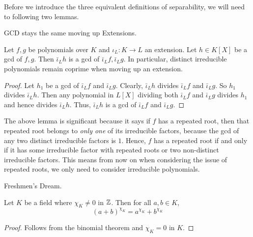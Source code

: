 \documentclass[../book.tex]{subfiles}
\begin{document}
Before we introduce the three equivalent definitions of separability, 
we will need to following two lemmas. 
\begin{lem} GCD stays the same moving up Extensions. 
    
    Let $f, g$ be polynomials over $K$ and $\iota_L : K \to L$ an extension.
    Let $h \in K[X]$ be a gcd of $f, g$. 
    Then $\bar\iota_L h$ is a gcd of $\bar\iota_L f, \bar\iota_L g$. 
    In particular, distinct irreducible polynomials remain coprime 
    when moving up an extension. 
\end{lem}
\begin{proof}
    Let $h_1$ be a gcd of $\bar\iota_L f$ and $\bar\iota_L g$. 
    Clearly, $\bar\iota_L h$ divides $\bar\iota_L f$ and $\bar\iota_L g$. 
    So $h_1$ divides $\bar\iota_L h$. 
    Then any polynomial in $L[X]$ dividing both $\bar\iota_L f$ and $\bar\iota_L g$
    divides $h_1$ and hence divides $\bar\iota_L h$. 
    Thus, $\bar\iota_L h$ is a gcd of $\bar\iota_L f$ and $\bar\iota_L g$. 
\end{proof}
\begin{rmk}
    The above lemma is significant because it says
    if $f$ has a repeated root, then that repeated root belongs to 
    \emph{only one} of its irreducible factors, 
    because the gcd of any two distinct irreducible factors is $1$. 
    Hence, $f$ has a repeated root if and only if it has some
    irreducible factor with repeated roots or two non-distinct irreducible factors.
    This means from now on when considering the issue of repeated roots, 
    we only need to consider irreducible polynomials. 
\end{rmk}
\begin{lem} Freshmen's Dream.
    
    Let $K$ be a field where $\chi_K \neq 0$ in $\mathbb{Z}$. 
    Then for all $a, b \in K$, \[
        (a+b)^{\chi_K} = a^{\chi_K} + b^{\chi_K}
    \]
\end{lem}
\begin{proof}
    Follows from the binomial theorem and $\chi_K = 0$ in $K$. 
\end{proof}
\end{document}
